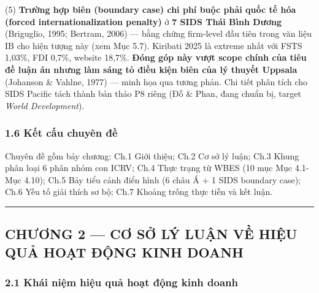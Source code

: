 \documentclass[12pt,a4paper]{article}
\begin{document}
(5) \textbf{Trường hợp biên (boundary case) chi phí buộc phải quốc tế
hóa (forced internationalization penalty)} ở \textbf{7 SIDS Thái Bình
Dương} (Briguglio, 1995; Bertram, 2006) --- bằng chứng firm-level đầu
tiên trong văn liệu IB cho hiện tượng này (xem Mục 5.7). Kiribati 2025
là extreme nhất với FSTS 1,03\%, FDI 0,7\%, website 18,7\%. \textbf{Đóng
góp này vượt scope chính của tiêu đề luận án nhưng làm sáng tỏ điều kiện
biên của lý thuyết Uppsala} (Johanson \& Vahlne, 1977) --- minh họa qua
tương phản. Chi tiết phân tích cho SIDS Pacific tách thành bản thảo P8
riêng (Đỗ \& Phan, đang chuẩn bị, target \emph{World Development}).

\hypertarget{16-kux1ebft-cux1ea5u-chuyuxean-ux111ux1ec1}{%
\subsubsection{1.6 Kết cấu chuyên
đề}\label{16-kux1ebft-cux1ea5u-chuyuxean-ux111ux1ec1}}

Chuyên đề gồm bảy chương: Ch.1 Giới thiệu; Ch.2 Cơ sở lý luận; Ch.3
Khung phân loại 6 phân nhóm con ICRV; Ch.4 Thực trạng từ WBES (10 mục
Mục 4.1-Mục 4.10); Ch.5 Bảy tiểu cảnh điển hình (6 châu Á + 1 SIDS
boundary case); Ch.6 Yếu tố giải thích sơ bộ; Ch.7 Khoảng trống thực
tiễn và kết luận.

\begin{center}\rule{0.5\linewidth}{0.5pt}\end{center}

\hypertarget{chux1b0ux1a1ng-2--cux1a1-sux1edf-luxfd-luux1eadn-vux1ec1-hiux1ec7u-quux1ea3-houx1ea1t-ux111ux1ed9ng-kinh-doanh}{%
\subsection{CHƯƠNG 2 --- CƠ SỞ LÝ LUẬN VỀ HIỆU QUẢ HOẠT ĐỘNG KINH
DOANH}\label{chux1b0ux1a1ng-2--cux1a1-sux1edf-luxfd-luux1eadn-vux1ec1-hiux1ec7u-quux1ea3-houx1ea1t-ux111ux1ed9ng-kinh-doanh}}

\hypertarget{21-khuxe1i-niux1ec7m-hiux1ec7u-quux1ea3-houx1ea1t-ux111ux1ed9ng-kinh-doanh}{%
\subsubsection{2.1 Khái niệm hiệu quả hoạt động kinh
doanh}\label{21-khuxe1i-niux1ec7m-hiux1ec7u-quux1ea3-houx1ea1t-ux111ux1ed9ng-kinh-doanh}}
\end{document}
